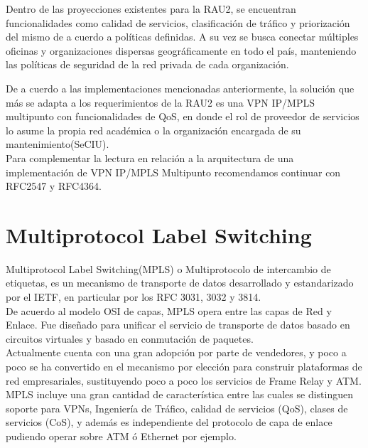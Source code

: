 Dentro de las proyecciones existentes para la RAU2, se encuentran funcionalidades como calidad de servicios, clasificaci\'on de tr\'afico y priorizaci\'on del mismo de a cuerdo a pol\'iticas definidas. A su vez se busca conectar m\'ultiples oficinas y organizaciones dispersas geogr\'aficamente en todo el país, manteniendo las pol\'iticas de seguridad de la red privada de cada organizaci\'on. 

De a cuerdo a las implementaciones mencionadas anteriormente, la soluci\'on que m\'as se adapta a los requerimientos de la RAU2 es una VPN IP/MPLS multipunto con funcionalidades de QoS, en donde el rol de proveedor de servicios lo asume la propia red académica o la organizaci\'on encargada de su mantenimiento(SeCIU).\\ 

Para complementar la lectura en relaci\'on a la arquitectura de una implementaci\'on de VPN IP/MPLS Multipunto recomendamos continuar con RFC2547\citep{rosen1999bgp} y RFC4364\citep{rosen2006bgp}.

\section{Multiprotocol Label Switching}
\label{section2.8}

Multiprotocol Label Switching(MPLS) o Multiprotocolo de intercambio de etiquetas, es un mecanismo de transporte de datos desarrollado y estandarizado por el IETF, en particular por los RFC 3031\cite{rosen2001multiprotocol}, 3032\citep{rosen2001mpls} y 3814\citep{nadeau2004multiprotocol}.\\

De acuerdo al modelo OSI de capas, MPLS opera entre las capas de Red y Enlace. Fue diseñado para unificar el servicio de transporte de datos basado en circuitos virtuales y basado en conmutación de paquetes.\\

Actualmente cuenta con una gran adopción por parte de vendedores, y poco a poco se ha convertido en el mecanismo por elección para construir plataformas de red empresariales, sustituyendo poco a poco los servicios de Frame Relay y ATM.\\
 
MPLS incluye una gran cantidad de característica entre las cuales se distinguen soporte para VPNs, Ingeniería de Tráfico, calidad de servicios (QoS), clases de servicios (CoS), y además es independiente del protocolo de capa de enlace pudiendo operar sobre ATM ó Ethernet por ejemplo.\\

